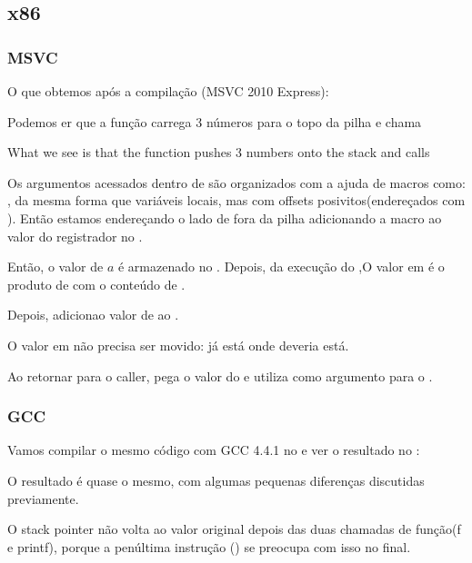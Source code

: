 \subsection{x86}

\subsubsection{MSVC}

O que obtemos após a compilação (MSVC 2010 Express):




Podemos er que a função \main carrega 3 números para o topo da pilha e chama 

What we see is that the \main function pushes 3 numbers onto the stack and calls  

Os argumentos acessados dentro de \ttf são organizados com a ajuda de macros como: \\
, da mesma forma que variáveis locais, mas com offsets posivitos(endereçados com ). Então estamos endereçando o lado de fora da pilha adicionando a macro  ao valor do registrador no \EBP.


Então, o valor de $a$ é armazenado no \EAX. Depois, da execução do \IMUL,O valor em \EAX é o \gls{produto} de \EAX com o conteúdo de .

Depois, \ADD adicionao valor de  ao \EAX.

O valor em \EAX não precisa ser movido: já está onde deveria está.

Ao retornar para o \gls{caller}, pega o valor do \EAX e utiliza como argumento para o \printf.



\subsubsection{GCC}

Vamos compilar o mesmo código com GCC 4.4.1 no e ver o resultado no \IDA:



O resultado é quase o mesmo, com algumas pequenas diferenças discutidas previamente.

O \gls{stack pointer} não volta ao valor original depois das duas chamadas de função(f e printf), 
porque a penúltima instrução  () 
se preocupa com isso no final.